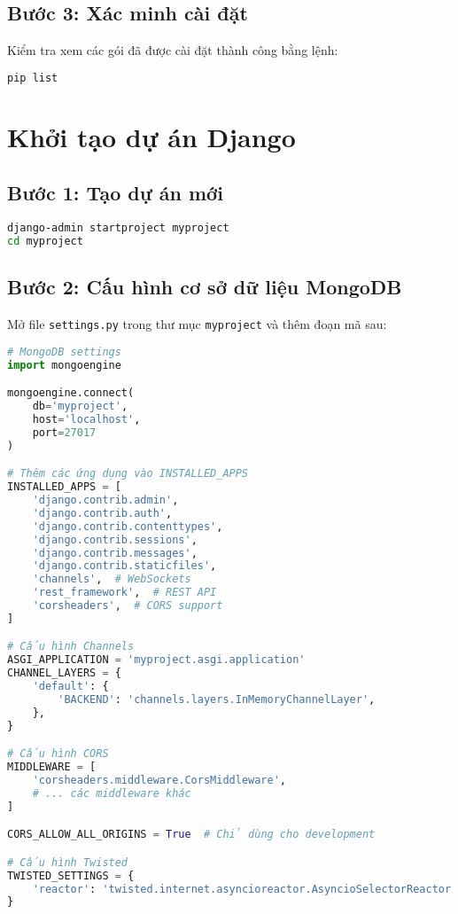 \documentclass[12pt,a4paper]{article}
\begin{document}
\subsection{Bước 3: Xác minh cài đặt}

Kiểm tra xem các gói đã được cài đặt thành công bằng lệnh:

\begin{lstlisting}[language=bash]
pip list
\end{lstlisting}

\section{Khởi tạo dự án Django}

\subsection{Bước 1: Tạo dự án mới}

\begin{lstlisting}[language=bash]
django-admin startproject myproject
cd myproject
\end{lstlisting}

\subsection{Bước 2: Cấu hình cơ sở dữ liệu MongoDB}

Mở file \texttt{settings.py} trong thư mục \texttt{myproject} và thêm đoạn mã sau:

\begin{lstlisting}[language=python]
# MongoDB settings
import mongoengine

mongoengine.connect(
    db='myproject',
    host='localhost',
    port=27017
)

# Thêm các ứng dụng vào INSTALLED_APPS
INSTALLED_APPS = [
    'django.contrib.admin',
    'django.contrib.auth',
    'django.contrib.contenttypes',
    'django.contrib.sessions',
    'django.contrib.messages',
    'django.contrib.staticfiles',
    'channels',  # WebSockets
    'rest_framework',  # REST API
    'corsheaders',  # CORS support
]

# Cấu hình Channels
ASGI_APPLICATION = 'myproject.asgi.application'
CHANNEL_LAYERS = {
    'default': {
        'BACKEND': 'channels.layers.InMemoryChannelLayer',
    },
}

# Cấu hình CORS
MIDDLEWARE = [
    'corsheaders.middleware.CorsMiddleware',
    # ... các middleware khác
]

CORS_ALLOW_ALL_ORIGINS = True  # Chỉ dùng cho development

# Cấu hình Twisted
TWISTED_SETTINGS = {
    'reactor': 'twisted.internet.asyncioreactor.AsyncioSelectorReactor',
}
\end{lstlisting}
\end{document}

